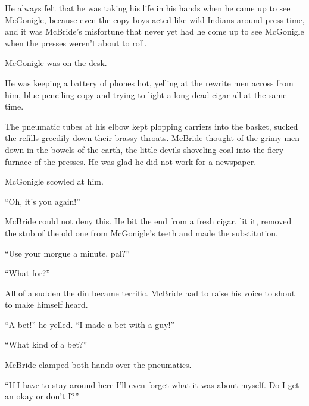 \documentclass{novel}
\begin{document}
\vspace{2\nbs}
\clearpage
\thispagestyle{empty}
\begin{ChapterStart}
\vspace{3\nbs}
\end{ChapterStart}

He always felt that he was taking his life in his hands when he came up to see McGonigle, because even the copy boys acted like wild Indians around press time, and it was McBride’s misfortune that never yet had he come up to see McGonigle when the presses weren’t about to roll.

McGonigle was on the desk. 

He was keeping a battery of phones hot, yelling at the rewrite men across from him, blue-penciling copy and trying to light a long-dead cigar all at the same time.

The pneumatic tubes at his elbow kept plopping carriers into the basket, sucked the refills greedily down their brassy throats. McBride thought of the grimy men down in the bowels of the earth, the little devils shoveling coal into the fiery furnace of the presses. He was glad he did not work for a newspaper.

McGonigle scowled at him.

“Oh, it’s you again!”

\null

McBride could not deny this. He bit the end from a fresh cigar, lit it, removed the stub of the old one from McGonigle’s teeth and made the substitution.

“Use your morgue a minute, pal?”

“What for?”

All of a sudden the din became terrific. McBride had to raise his voice to shout to make himself heard.

“A bet!” he yelled. “I made a bet with a guy!”

“What kind of a bet?”

McBride clamped both hands over the pneumatics.

“If I have to stay around here I’ll even forget what it was about myself. Do I get an okay or don’t I?”
\end{document}
